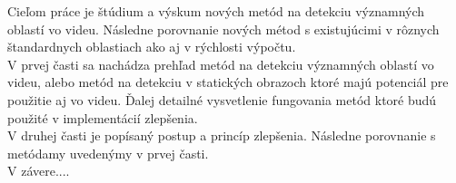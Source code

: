 Cieľom práce je štúdium a výskum nových metód na detekciu významných oblastí vo videu. Následne porovnanie nových métod s existujúcimi v rôznych štandardnych oblastiach ako aj v rýchlosti výpočtu.
\\
V prvej časti sa nachádza prehľad metód na detekciu významných oblastí vo videu, alebo metód na detekciu v statických obrazoch ktoré majú potenciál pre použitie aj vo videu. Ďalej detailné vysvetlenie fungovania metód ktoré budú použité v implementácií zlepšenia.
\\
V druhej časti je popísaný postup a princíp zlepšenia. Následne porovnanie s metódamy uvedenýmy v prvej časti.
\\
V závere....
